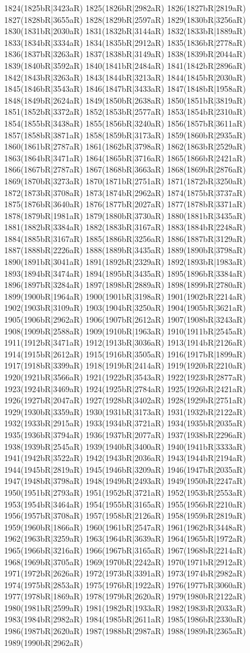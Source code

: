 1824(1825bR|3423aR) 1825(1826bR|2982aR) 1826(1827bR|2819aR) 1827(1828bR|3655aR) 1828(1829bR|2597aR) 1829(1830bR|3256aR) 1830(1831bR|2030aR) 1831(1832bR|3144aR) 1832(1833bR|1889aR) 1833(1834bR|3334aR) 1834(1835bR|2912aR) 1835(1836bR|2778aR) 1836(1837bR|3263aR) 1837(1838bR|3149aR) 1838(1839bR|2044aR) 1839(1840bR|3592aR) 1840(1841bR|2484aR) 1841(1842bR|2896aR) 1842(1843bR|3263aR) 1843(1844bR|3213aR) 1844(1845bR|2030aR) 1845(1846bR|3543aR) 1846(1847bR|3433aR) 1847(1848bR|1958aR) 1848(1849bR|2624aR) 1849(1850bR|2638aR) 1850(1851bR|3819aR) 1851(1852bR|3372aR) 1852(1853bR|2577aR) 1853(1854bR|2310aR) 1854(1855bR|3438aR) 1855(1856bR|3240aR) 1856(1857bR|3611aR) 1857(1858bR|3871aR) 1858(1859bR|3173aR) 1859(1860bR|2935aR) 1860(1861bR|2787aR) 1861(1862bR|3798aR) 1862(1863bR|2529aR) 1863(1864bR|3471aR) 1864(1865bR|3716aR) 1865(1866bR|2421aR) 1866(1867bR|2787aR) 1867(1868bR|3663aR) 1868(1869bR|2876aR) 1869(1870bR|3273aR) 1870(1871bR|2751aR) 1871(1872bR|3250aR) 1872(1873bR|3708aR) 1873(1874bR|2962aR) 1874(1875bR|3737aR) 1875(1876bR|3640aR) 1876(1877bR|2027aR) 1877(1878bR|3371aR) 1878(1879bR|1981aR) 1879(1880bR|3730aR) 1880(1881bR|3435aR) 1881(1882bR|3384aR) 1882(1883bR|3167aR) 1883(1884bR|2248aR) 1884(1885bR|3167aR) 1885(1886bR|3256aR) 1886(1887bR|3129aR) 1887(1888bR|2226aR) 1888(1889bR|3435aR) 1889(1890bR|3798aR) 1890(1891bR|3041aR) 1891(1892bR|2329aR) 1892(1893bR|1983aR) 1893(1894bR|3474aR) 1894(1895bR|3435aR) 1895(1896bR|3384aR) 1896(1897bR|3284aR) 1897(1898bR|2889aR) 1898(1899bR|2780aR) 1899(1900bR|1964aR) 1900(1901bR|3198aR) 1901(1902bR|2214aR) 1902(1903bR|3109aR) 1903(1904bR|3250aR) 1904(1905bR|3621aR) 1905(1906bR|2962aR) 1906(1907bR|2612aR) 1907(1908bR|3243aR) 1908(1909bR|2588aR) 1909(1910bR|1963aR) 1910(1911bR|2545aR) 1911(1912bR|3471aR) 1912(1913bR|3036aR) 1913(1914bR|2126aR) 1914(1915bR|2612aR) 1915(1916bR|3505aR) 1916(1917bR|1899aR) 1917(1918bR|3399aR) 1918(1919bR|2414aR) 1919(1920bR|2210aR) 1920(1921bR|3566aR) 1921(1922bR|3543aR) 1922(1923bR|2877aR) 1923(1924bR|3469aR) 1924(1925bR|2784aR) 1925(1926bR|2421aR) 1926(1927bR|2047aR) 1927(1928bR|3402aR) 1928(1929bR|2751aR) 1929(1930bR|3359aR) 1930(1931bR|3173aR) 1931(1932bR|2122aR) 1932(1933bR|2915aR) 1933(1934bR|3721aR) 1934(1935bR|2035aR) 1935(1936bR|3794aR) 1936(1937bR|2077aR) 1937(1938bR|2296aR) 1938(1939bR|2545aR) 1939(1940bR|3400aR) 1940(1941bR|3333aR) 1941(1942bR|3522aR) 1942(1943bR|2036aR) 1943(1944bR|2194aR) 1944(1945bR|2819aR) 1945(1946bR|3209aR) 1946(1947bR|2035aR) 1947(1948bR|3798aR) 1948(1949bR|2493aR) 1949(1950bR|2247aR) 1950(1951bR|2793aR) 1951(1952bR|3721aR) 1952(1953bR|2553aR) 1953(1954bR|3464aR) 1954(1955bR|3165aR) 1955(1956bR|2210aR) 1956(1957bR|3708aR) 1957(1958bR|2126aR) 1958(1959bR|2819aR) 1959(1960bR|1866aR) 1960(1961bR|2547aR) 1961(1962bR|3448aR) 1962(1963bR|3259aR) 1963(1964bR|3639aR) 1964(1965bR|1972aR) 1965(1966bR|3216aR) 1966(1967bR|3165aR) 1967(1968bR|2214aR) 1968(1969bR|3705aR) 1969(1970bR|2242aR) 1970(1971bR|2912aR) 1971(1972bR|2626aR) 1972(1973bR|3391aR) 1973(1974bR|2982aR) 1974(1975bR|2853aR) 1975(1976bR|1922aR) 1976(1977bR|3060aR) 1977(1978bR|1869aR) 1978(1979bR|2620aR) 1979(1980bR|2122aR) 1980(1981bR|2599aR) 1981(1982bR|1933aR) 1982(1983bR|2033aR) 1983(1984bR|2982aR) 1984(1985bR|2611aR) 1985(1986bR|2330aR) 1986(1987bR|2620aR) 1987(1988bR|2987aR) 1988(1989bR|2365aR) 1989(1990bR|2962aR) 